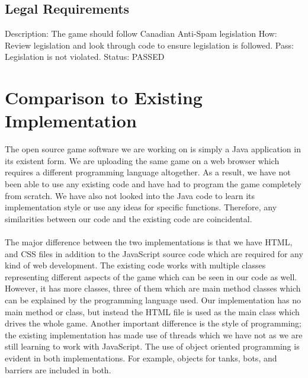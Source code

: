 \documentclass{article}
\begin{document}
\subsection{Legal Requirements}
\label{sec:4.7}
 Description: The game should follow Canadian Anti-Spam legislation \newline
 How: Review legislation and look through code to ensure legislation is 
 followed. \newline
 Pass: Legislation is not violated.
 \newline Status: PASSED
 
\section{Comparison to Existing Implementation}
The open source game software we are working on is simply a Java application 
in its existent form. We are uploading the same game on a web browser which 
requires a different programming language altogether. As a result, we have not 
been able to use any existing code and have had to program the game completely 
from scratch. We have also not looked into the Java code to learn its 
implementation style or use any ideas for specific functions. Therefore, any 
similarities between our code and the existing code are coincidental. \\ \\
The major difference between the two implementations is that we have HTML, and 
CSS files in addition to the JavaScript source code which are required for any 
kind of web development. The existing code works with multiple classes 
representing different aspects of the game which can be seen in our code as 
well. However, it has more classes, three of them which are main method 
classes which can be explained by the programming language used. Our 
implementation has no main method or class, but instead the HTML file is used 
as the main class which drives the whole game. Another important difference is 
the style of programming; the existing implementation has made use of threads 
which we have not as we are still learning to work with JavaScript. The use of 
object oriented programming is evident in both implementations. For example, 
objects for tanks, bots, and barriers are included in both. 





\end{document}

